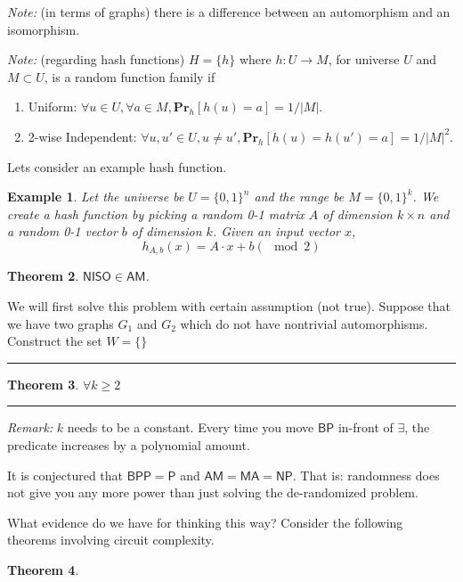 \documentclass[twoside]{article}
\newcounter{lecnum}
\newtheorem{theorem}{Theorem}[lecnum]
\newtheorem{example}[theorem]{Example}
\newenvironment{proof}{{\bf Proof:}}{\hfill\rule{2mm}{2mm}}
\def\Pr{\mathbf{Pr}}
\def\P{\mathsf{P}}
\def\NP{\mathsf{NP}}
\def\BP{\mathsf{BP}}
\def\BPP{\mathsf{BPP}}
\def\NISO{\mathsf{NISO}}
\def\MA{\mathsf{MA}}
\def\AM{\mathsf{AM}}
\begin{document}
\emph{Note:} (in terms of graphs) there is a difference between an automorphism and an isomorphism.

\emph{Note:} (regarding hash functions) $H = \{h\}$ where $h: U \rightarrow M$, for universe $U$ and $M \subset U$, is a random function family if 
\begin{enumerate}
\item Uniform: $\forall u \in U, \forall a \in M, \Pr_h[h(u) = a] = 1/|M|$.
\item 2-wise Independent: $\forall u, u' \in U, u \neq u', \Pr_h[h(u) = h(u') = a] = 1/|M|^2$.
\end{enumerate}   

Lets consider an example hash function. 
\begin{example}
Let the universe be $U = \{0,1\}^n$ and the range be $M = \{0,1\}^k$. We create a hash function by picking a random 0-1 matrix $A$ of dimension $k \times n$ and a random 0-1 vector $b$ of dimension $k$. Given an input vector $x$,
\[h_{A, b} (x) = A\cdot x + b (\mod 2)\]

\end{example}

\begin{theorem}
$\NISO \in \AM$.
\end{theorem}
\begin{proof}
We will first solve this problem with certain assumption (not true). Suppose that we have two graphs $G_1$ and $G_2$ which do not have nontrivial automorphisms. Construct the set $W = \{\}$
\end{proof}

\begin{theorem}
$\forall k \geq 2$
\end{theorem}
\begin{proof}

\end{proof}
\emph{Remark: } $k$ needs to be a constant. Every time you move $\BP$ in-front of $\exists$, the predicate increases by a polynomial amount.

It is conjectured that $\BPP = \P$ and $\AM = \MA = \NP$. That is: randomness does not give you any more power than just solving the de-randomized problem. 

What evidence do we have for thinking this way? Consider the following theorems involving circuit complexity. 
\begin{theorem}

\end{theorem}
\end{document}
